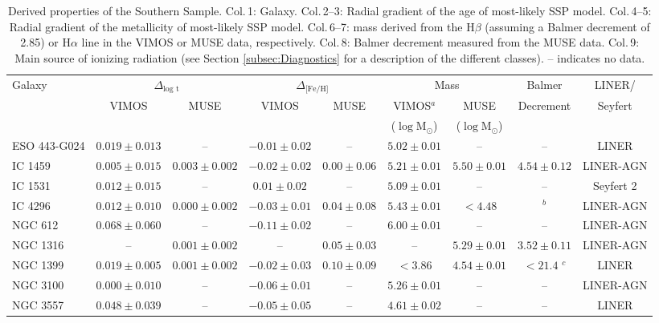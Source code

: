 \documentclass[a4paper,fleqn,usenatbib]{mnras}
\begin{document}
		\begin{table}
			\centering
			\caption{Derived properties of the Southern Sample. Col.\,1: Galaxy. Col.\,2--3: Radial gradient of the age of most-likely SSP model. Col.\,4--5: Radial gradient of the metallicity of most-likely SSP model. Col.\,6--7:  mass derived from the H$\beta$ (assuming a Balmer decrement of 2.85) or H$\alpha$ line in the VIMOS or MUSE data, respectively. Col.\,8: Balmer decrement measured from the MUSE data. Col.\,9: Main source of ionizing radiation (see Section \ref{subsec:Diagnostics} for a description of the different classes). -- indicates no data.}
			\label{tab:derivedProp}
			\begin{tabular}{l c c c c c c c c}
				\hline
				\hline 
				Galaxy 	& \multicolumn{2}{c}{$\Delta_\text{log t}$} & \multicolumn{2}{c}{$\Delta_\text{[Fe/H]}$} & \multicolumn{2}{c}{\ion{H}{ii} Mass} & Balmer & LINER/ \\
						& VIMOS & MUSE & VIMOS & MUSE & VIMOS$^{a}$ & MUSE & Decrement & Seyfert \\
						& & & & & ($\log\mathrm{M_\odot}$) & ($\log\mathrm{M_\odot}$) & \\
					\hline
					ESO 443-G024 & $0.019 \pm 0.013$ & -- & $-0.01 \pm 0.02$ & -- & $5.02 \pm 0.01$ & -- & -- & LINER \\
					IC 1459 	& $0.005 \pm 0.015$ & $0.003 \pm 0.002$ & $-0.02 \pm 0.02$ & $0.00 \pm 0.06$ & $5.21 \pm 0.01$ & $5.50 \pm 0.01$ & $4.54 \pm 0.12$ & LINER-AGN \\
					IC 1531 	& $0.012 \pm 0.015$ & -- & $0.01 \pm 0.02$ & -- & $5.09 \pm 0.01$ & -- & -- & Seyfert 2\\
					IC 4296		& $0.012 \pm 0.010$ & $0.000 \pm 0.002$ & $-0.03 \pm 0.01$ & $0.04 \pm 0.08$ & $5.43 \pm 0.01$	& $< 4.48$ 	& $^{b}$ & LINER-AGN \\
					NGC 612 	& $0.068 \pm 0.060$ & -- & $-0.11 \pm 0.02$ & -- & $6.00 \pm 0.01$ 	& -- 		& -- & LINER-AGN \\
					NGC 1316 	& -- & $0.001 \pm 0.002$ & -- &$0.05 \pm 0.03$ & -- 				& $ 5.29 \pm 0.01$ & $3.52 \pm 0.11$ & LINER-AGN \\
					NGC 1399 	& $0.019 \pm 0.005$ & $0.001 \pm 0.002$ & $-0.02 \pm 0.03$ & $0.10 \pm 0.09$ & $< 3.86$ 			& $ 4.54 \pm 0.01$ & $< 21.4$ $^{c}$ & LINER \\
					NGC 3100 	& $0.000 \pm 0.010$ & -- & $-0.06 \pm 0.01$ & -- & $5.26 \pm 0.01$	& -- 		& -- & LINER-AGN \\
					NGC 3557 	& $0.048 \pm 0.039$ & -- & $-0.05 \pm 0.05$ & -- & $4.61 \pm 0.02$ 	& -- 		& -- & LINER \\

\end{tabular}
\end{table}
\end{document}
